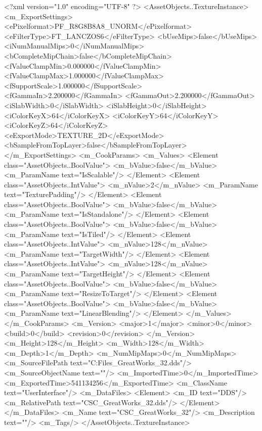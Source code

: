 <?xml version="1.0" encoding="UTF-8" ?>
<AssetObjects..TextureInstance>
	<m_ExportSettings>
		<ePixelformat>PF_R8G8B8A8_UNORM</ePixelformat>
		<eFilterType>FT_LANCZOS6</eFilterType>
		<bUseMips>false</bUseMips>
		<iNumManualMips>0</iNumManualMips>
		<bCompleteMipChain>false</bCompleteMipChain>
		<fValueClampMin>0.000000</fValueClampMin>
		<fValueClampMax>1.000000</fValueClampMax>
		<fSupportScale>1.000000</fSupportScale>
		<fGammaIn>2.200000</fGammaIn>
		<fGammaOut>2.200000</fGammaOut>
		<iSlabWidth>0</iSlabWidth>
		<iSlabHeight>0</iSlabHeight>
		<iColorKeyX>64</iColorKeyX>
		<iColorKeyY>64</iColorKeyY>
		<iColorKeyZ>64</iColorKeyZ>
		<eExportMode>TEXTURE_2D</eExportMode>
		<bSampleFromTopLayer>false</bSampleFromTopLayer>
	</m_ExportSettings>
	<m_CookParams>
		<m_Values>
			<Element class="AssetObjects..BoolValue">
				<m_bValue>false</m_bValue>
				<m_ParamName text="IsScalable"/>
			</Element>
			<Element class="AssetObjects..IntValue">
				<m_nValue>2</m_nValue>
				<m_ParamName text="TexturePadding"/>
			</Element>
			<Element class="AssetObjects..BoolValue">
				<m_bValue>false</m_bValue>
				<m_ParamName text="IsStandalone"/>
			</Element>
			<Element class="AssetObjects..BoolValue">
				<m_bValue>false</m_bValue>
				<m_ParamName text="IsTiled"/>
			</Element>
			<Element class="AssetObjects..IntValue">
				<m_nValue>128</m_nValue>
				<m_ParamName text="TargetWidth"/>
			</Element>
			<Element class="AssetObjects..IntValue">
				<m_nValue>128</m_nValue>
				<m_ParamName text="TargetHeight"/>
			</Element>
			<Element class="AssetObjects..BoolValue">
				<m_bValue>false</m_bValue>
				<m_ParamName text="ResizeToTarget"/>
			</Element>
			<Element class="AssetObjects..BoolValue">
				<m_bValue>false</m_bValue>
				<m_ParamName text="LinearBlending"/>
			</Element>
		</m_Values>
	</m_CookParams>
	<m_Version>
		<major>1</major>
		<minor>0</minor>
		<build>0</build>
		<revision>0</revision>
	</m_Version>
	<m_Height>128</m_Height>
	<m_Width>128</m_Width>
	<m_Depth>1</m_Depth>
	<m_NumMipMaps>0</m_NumMipMaps>
	<m_SourceFilePath text="C:\Users\Shadow\Desktop\Working Files\Icons\GreatWorks\CSC_GreatWorks_32.dds"/>
	<m_SourceObjectName text=""/>
	<m_ImportedTime>0</m_ImportedTime>
	<m_ExportedTime>541134256</m_ExportedTime>
	<m_ClassName text="UserInterface"/>
	<m_DataFiles>
		<Element>
			<m_ID text="DDS"/>
			<m_RelativePath text="CSC_GreatWorks_32.dds"/>
		</Element>
	</m_DataFiles>
	<m_Name text="CSC_GreatWorks_32"/>
	<m_Description text=""/>
	<m_Tags/>
</AssetObjects..TextureInstance>

